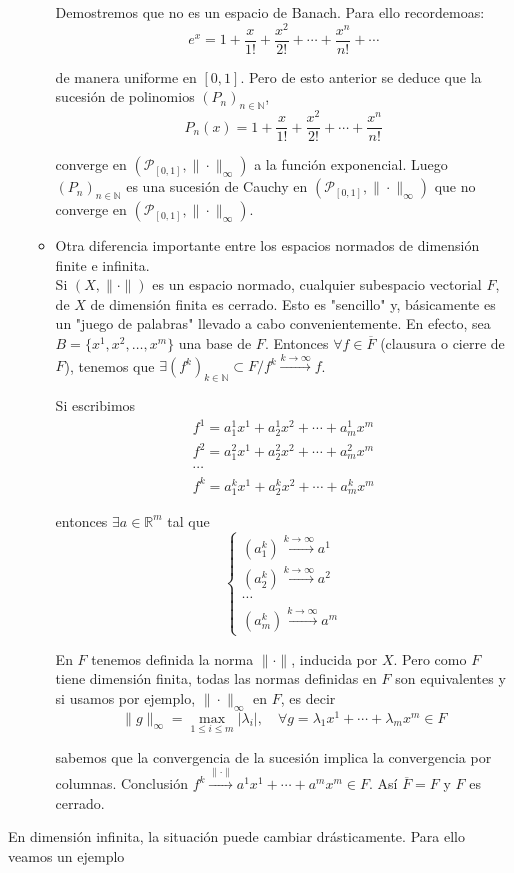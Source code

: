 \documentclass{article}
\begin{document}
\begin{enumerate}
\begin{itemize}
Demostremos que no es un espacio de Banach. Para ello recordemoas:
\begin{equation*}
e^x=1+\frac{x}{1!}+\frac{x^2}{2!}+\cdots+\frac{x^n}{n!}+\cdots
\end{equation*}

de manera uniforme en $[0,1]$. Pero de esto anterior se deduce que la sucesión de polinomios $(P_n)_{n\in\mathbb{N}}$,
\begin{equation*}
P_n(x)=1+\frac{x}{1!}+\frac{x^2}{2!}+\cdots+\frac{x^n}{n!}
\end{equation*}

converge en $(\mathcal{P}_{[0,1]},\|\cdot\|_\infty)$ a la función exponencial. Luego $(P_n)_{n\in\mathbb{N}}$ es una sucesión de Cauchy en $(\mathcal{P}_{[0,1]},\|\cdot\|_\infty)$ que no converge en $(\mathcal{P}_{[0,1]},\|\cdot\|_\infty)$.

\item Otra diferencia importante entre los espacios normados de dimensión finite e infinita.\\

Si $(X,\|\cdot\|)$ es un espacio normado, cualquier subespacio vectorial $F$, de $X$ de dimensión finita es cerrado. Esto es "sencillo" y, básicamente es un "juego de palabras" llevado a cabo convenientemente. En efecto, sea $B=\{x^1,x^2,\ldots,x^m\}$ una base de $F$. Entonces $\forall f\in \overline{F}$ (clausura o cierre de $F$), tenemos que $\exists (f^k)_{k\in\mathbb{N}}\subset F/f^k\xrightarrow{k\to\infty}f$.

Si escribimos
\begin{gather*}
f^1=a_1^1x^1+a_2^1x^2+\cdots+a^1_mx^m\\
f^2=a_1^2x^1+a_2^2x^2+\cdots+a^2_mx^m\\
\cdots\\
f^k=a_1^kx^1+a_2^kx^2+\cdots +a_m^kx^m
\end{gather*}

entonces $\exists a\in \mathbb{R}^m$ tal que
\begin{equation*}
\left\lbrace\begin{array}{c}
(a_1^k)\xrightarrow{k\to\infty} a^1\\
(a_2^k)\xrightarrow{k\to\infty} a^2\\
\cdots\\
(a^k_m)\xrightarrow{k\to\infty}a^m
\end{array}\right.
\end{equation*}

En $F$ tenemos definida la norma $\|\cdot\|$, inducida por $X$. Pero como $F$ tiene dimensión finita, todas las normas definidas en $F$ son equivalentes y si usamos por ejemplo, $\|\cdot\|_\infty$ en $F$, es decir
\begin{equation*}
\|g\|_{\infty}=\max_{1\leq i\leq m}|\lambda_i|,\quad \forall g=\lambda_1x^1+\cdots+\lambda_m x^m\in F
\end{equation*}

sabemos que la convergencia de la sucesión implica la convergencia por columnas. Conclusión $f^k\xrightarrow{\|\cdot\|}a^1x^1+\cdots+a^mx^m\in F$. Así $\overline{F}=F$ y $F$ es cerrado.
\end{itemize}
\end{enumerate}


En dimensión infinita, la situación puede cambiar drásticamente. Para ello veamos un ejemplo
\end{document}
